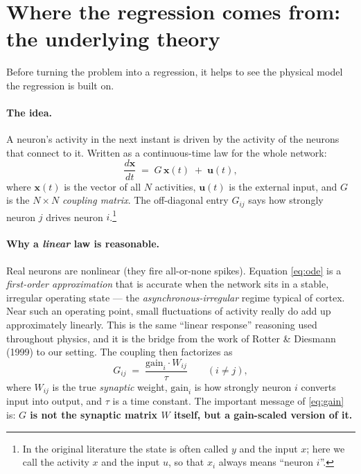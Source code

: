 \documentclass[11pt,a4paper]{article}
\newcommand{\xx}{\mathbf{x}}
\newcommand{\uu}{\mathbf{u}}
\begin{document}
\section{Where the regression comes from: the underlying theory}
\label{sec:theory}

Before turning the problem into a regression, it helps to see the physical model
the regression is built on.

\paragraph{The idea.}
A neuron's activity in the next instant is driven by the activity of the neurons
that connect to it. Written as a continuous-time law for the whole network:
\begin{equation}
\frac{d\xx}{dt} \;=\; G\,\xx(t) \;+\; \uu(t),
\label{eq:ode}
\end{equation}
where $\xx(t)$ is the vector of all $N$ activities, $\uu(t)$ is the external
input, and $G$ is the $N\times N$ \emph{coupling matrix}. The off-diagonal entry
$G_{ij}$ says how strongly neuron $j$ drives neuron $i$.\footnote{In the original
literature the state is often called $y$ and the input $x$; here we call the
activity $x$ and the input $u$, so that $x_i$ always means ``neuron $i$''.}

\paragraph{Why a \emph{linear} law is reasonable.}
Real neurons are nonlinear (they fire all-or-none spikes). Equation
\eqref{eq:ode} is a \emph{first-order approximation} that is accurate when the
network sits in a stable, irregular operating state --- the
\emph{asynchronous-irregular} regime typical of cortex. Near such an operating
point, small fluctuations of activity really do add up approximately linearly.
This is the same ``linear response'' reasoning used throughout physics, and it
is the bridge from the work of Rotter \& Diesmann (1999) to our setting. The
coupling then factorizes as
\begin{equation}
G_{ij} \;=\; \frac{\text{gain}_i \cdot W_{ij}}{\tau}\qquad (i\neq j),
\label{eq:gain}
\end{equation}
where $W_{ij}$ is the true \emph{synaptic} weight, $\text{gain}_i$ is how
strongly neuron $i$ converts input into output, and $\tau$ is a time constant.
The important message of \eqref{eq:gain} is: \textbf{$G$ is not the synaptic
matrix $W$ itself, but a gain-scaled version of it.}
\end{document}
